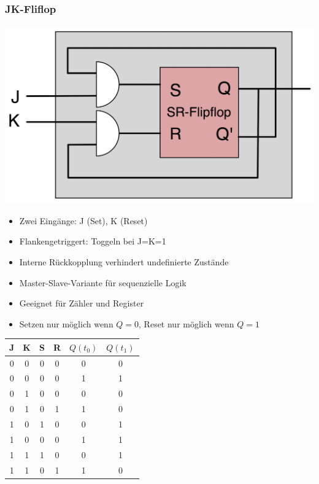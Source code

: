 \documentclass[a4paper,6pt]{article}
\begin{document}
\begin{multicols*}{3}
\subsubsection{JK-Fliflop}



\begin{center}
    \includegraphics[width=0.75\linewidth]{resources/Bildschirmfoto 2024-01-04 um 08.26.25.png}
\end{center}

\begin{itemize}
    \item Zwei Eingänge: J (Set), K (Reset)
    \item Flankengetriggert: Toggeln bei J=K=1
    \item Interne Rückkopplung verhindert undefinierte Zustände
    \item Master-Slave-Variante für sequenzielle Logik
    \item Geeignet für Zähler und Register
    \item Setzen nur möglich wenn $Q = 0$, Reset nur möglich wenn $Q = 1$
\end{itemize}

\begin{center}
    \begin{tabular}{|c|c|c|c||c|c|}
    \hline
    J & K & S & R & $Q(t_0)$ & $Q(t_1)$ \\ \hline
    0 & 0 & 0 & 0 & 0 & 0 \\ \hline
    0 & 0 & 0 & 0 & 1 & 1 \\ \hline
    0 & 1 & 0 & 0 & 0 & 0 \\ \hline
    0 & 1 & 0 & 1 & 1 & 0 \\ \hline
    1 & 0 & 1 & 0 & 0 & 1 \\ \hline
    1 & 0 & 0 & 0 & 1 & 1 \\ \hline
    1 & 1 & 1 & 0 & 0 & 1 \\ \hline
    1 & 1 & 0 & 1 & 1 & 0 \\ \hline
    \end{tabular}
\end{center}


\end{multicols*}
\end{document}
